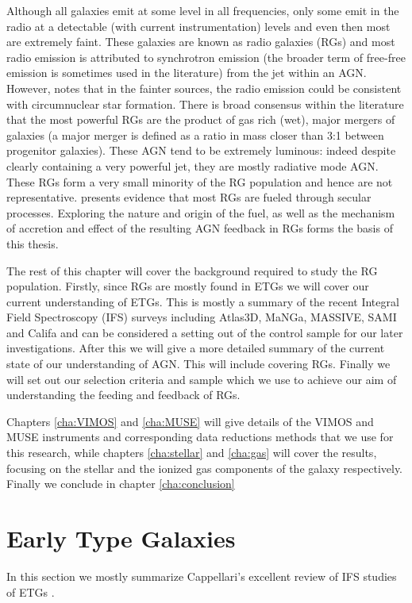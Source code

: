Although all galaxies emit at some level in all frequencies, only some emit in the radio at a detectable (with current instrumentation) levels and even then most are extremely faint. These galaxies are known as radio galaxies (RGs) and most radio emission is attributed to synchrotron emission (the broader term of free-free emission is sometimes used in the literature) from the jet within an AGN. However, \citet{Nyland2016} notes that in the fainter sources, the radio emission could be consistent with circumnuclear star formation. There is broad consensus within the literature that the most powerful RGs are the product of gas rich (wet), major mergers of galaxies (a major merger is defined as a ratio in mass closer than 3:1 between progenitor galaxies). These AGN tend to be extremely luminous: indeed despite clearly containing a very powerful jet, they are mostly radiative mode AGN. These RGs form a very small minority of the RG population and hence are not representative. \citet{Heckman2014} presents evidence that most RGs are fueled through secular processes. Exploring the nature and origin of the fuel, as well as the mechanism of accretion and effect of the resulting AGN feedback in RGs forms the basis of this thesis. 

The rest of this chapter will cover the background required to study the RG population. Firstly, since RGs are mostly found in ETGs we will cover our current understanding of ETGs. This is mostly a summary of the recent Integral Field Spectroscopy (IFS) surveys including Atlas3D, MaNGa, MASSIVE, SAMI and Califa and can be considered a setting out of the control sample for our later investigations. After this we will give a more detailed summary of the current state of our understanding of AGN. This will include covering RGs. Finally we will set out our selection criteria and sample which we use to achieve our aim of understanding the feeding and feedback of RGs.

Chapters \ref{cha:VIMOS} and \ref{cha:MUSE} will give details of the VIMOS and MUSE instruments and corresponding data reductions methods that we use for this research, while chapters \ref{cha:stellar} and \ref{cha:gas} will cover the results, focusing on the stellar and the ionized gas components of the galaxy respectively. Finally we conclude in chapter \ref{cha:conclusion}

\section{Early Type Galaxies}
	\label{sec:ETG}
	In this section we mostly summarize Cappellari's excellent review of IFS studies of ETGs \citep{Cappellari2016}. 

